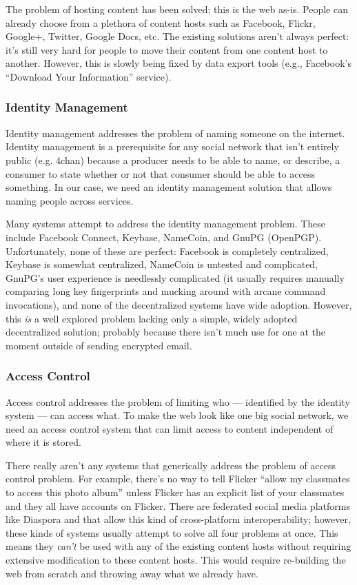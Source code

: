 \documentclass[pdftex,12pt,a4papaer,twoside,notitlepage]{report}
\begin{document}
The problem of hosting content has been solved; this is the web as-is. People
can already choose from a plethora of content hosts such as Facebook, Flickr,
Google+, Twitter, Google Docs, etc. The existing solutions aren't always
perfect: it's still very hard for people to move their content from one content
host to another. However, this is slowly being fixed by data export tools (e.g.,
Facebook's ``Download Your Information'' service).

\subsubsection{Identity Management}

Identity management addresses the problem of naming someone on the internet.
Identity management is a prerequisite for any social network that isn't entirely
public (e.g. 4chan) because a producer needs to be able to name, or describe, a
consumer to state whether or not that consumer should be able to access
something. In our case, we need an identity management solution that allows
naming people across services.

Many systems attempt to address the identity management problem. These include
Facebook Connect, Keybase, NameCoin, and GnuPG (OpenPGP). Unfortunately, none of
these are perfect: Facebook is completely centralized, Keybase is somewhat
centralized, NameCoin is untested and complicated, GnuPG's user experience is
needlessly complicated (it usually requires manually comparing long key
fingerprints and mucking around with arcane command invocations), and none of
the decentralized systems have wide adoption. However, this \emph{is} a well
explored problem lacking only a simple, widely adopted decentralized solution;
probably because there isn't much use for one at the moment outside of sending
encrypted email.

\subsubsection{Access Control}

Access control addresses the problem of limiting who --- identified by the
identity system --- can access what. To make the web look like one big social
network, we need an access control system that can limit access to content
independent of where it is stored.

There really aren't any systems that generically address the problem of access
control problem. For example, there's no way to tell Flicker ``allow my
classmates to access this photo album'' unless Flicker has an explicit list of
your classmates and they all have accounts on Flicker. There are federated
social media platforms like Diaspora and that allow this kind of cross-platform
interoperability; however, these kinds of systems usually attempt to solve all
four problems at once. This means they \emph{can't} be used with any of the
existing content hosts without requiring extensive modification to these content
hosts. This would require re-building the web from scratch and throwing away
what we already have.
\end{document}
